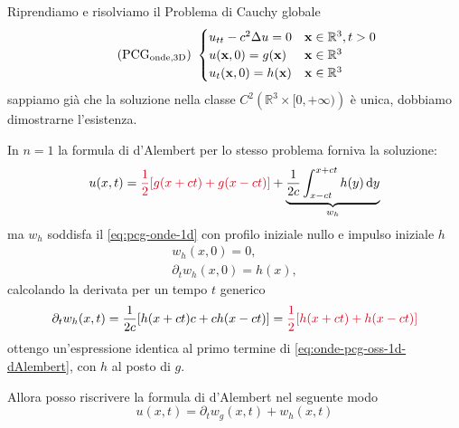 \documentclass[10pt,a4paper,twoside,openright]{book}
\newcommand{\x}{\mathbf{x}}
\newcommand{\de}{\,\mathrm d}
\newcommand{\dy}{\de y}
\begin{document}
Riprendiamo e risolviamo il Problema di Cauchy globale
\begin{equation*}
    \tag{PCG$_{\text{onde,3D}}$} \
    \begin{cases}
        u_{tt} -c^{2} \Delta u=0 & \x \in \mathbb{R}^{3} ,t >0 \\
        u(\x ,0) =g(\x)          & \x\in\mathbb{R}^{3}         \\
        u_{t}(\x ,0) =h(\x)      & \x\in\mathbb{R}^{3}
    \end{cases}
\end{equation*}
sappiamo già che la soluzione nella classe $C^{2}\left(\mathbb{R}^{3} \times [ 0,+\infty)\right)$ è unica, dobbiamo dimostrarne l'esistenza.
\begin{oss}
    In $n=1$ la formula di d'Alembert per lo stesso problema forniva la soluzione:
    \begin{equation}
        u(x,t) =\textcolor[rgb]{0.82,0.01,0.11}{\frac{1}{2}[g(x+ct)+g(x-ct)]} +\underbrace{\frac{1}{2c}\int _{x-ct}^{x+ct} h(y) \dy}_{w_{h}}
        \label{eq:onde-pcg-oss-1d-dAlembert}
    \end{equation}
    ma $\displaystyle w_{h}$ soddisfa il \eqref{eq:pcg-onde-1d} con profilo iniziale nullo e impulso iniziale $h$
    \begin{gather*}
        w_{h}(x,0) =0,\\
        \partial _{t} w_{h}(x,0) =h(x) ,
    \end{gather*}
    calcolando la derivata per un tempo $t$ generico
    \begin{equation*}
        \partial _{t} w_{h}(x,t) =\frac{1}{2c}[ h(x+ct) c+ch(x-ct)] =\textcolor[rgb]{0.82,0.01,0.11}{\frac{1}{2}[h(x+ct)+h(x-ct)]}
    \end{equation*}
    ottengo un'espressione identica al primo termine di \eqref{eq:onde-pcg-oss-1d-dAlembert}, con $h$ al posto di $g$.

    Allora posso riscrivere la formula di d'Alembert nel seguente modo
    \begin{equation*}
        u(x,t) =\partial _{t} w_{g}(x,t) +w_{h}(x,t)
    \end{equation*}
\end{oss}
\end{document}
